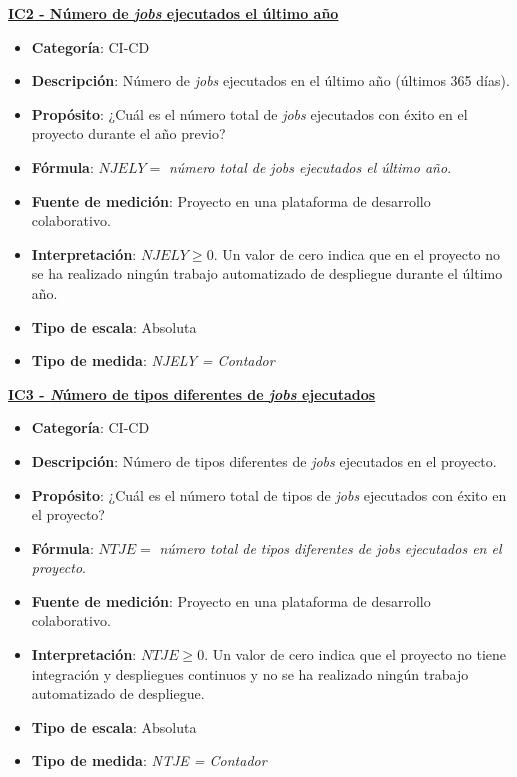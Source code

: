 \textbf{\underline{IC2 - Número de \textit{jobs} ejecutados el último año}}
\begin{itemize}
	\item \textbf{Categoría}: CI-CD
	\item \textbf{Descripción}: Número de \textit{jobs} ejecutados en el último año (últimos 365 días).
	\item \textbf{Propósito}: ¿Cuál es el número total de \textit{jobs} ejecutados con éxito en el proyecto durante el año previo?
	\item \textbf{Fórmula}: $NJELY =$ \textit{número total de jobs ejecutados el último año}.
	\item \textbf{Fuente de medición}: Proyecto en una plataforma de desarrollo colaborativo.
	\item \textbf{Interpretación}: $NJELY \geq 0$. Un valor de cero indica que en el proyecto no se ha realizado ningún trabajo automatizado de despliegue durante el último año.
	\item \textbf{Tipo de escala}: Absoluta
	\item \textbf{Tipo de medida}: \textit{NJELY = Contador}
\end{itemize}

\textbf{\underline{IC3 - \textit Número de tipos diferentes de \textit{jobs} ejecutados}}
\begin{itemize}
	\item \textbf{Categoría}: CI-CD
	\item \textbf{Descripción}: Número de tipos diferentes de \textit{jobs} ejecutados en el proyecto.
	\item \textbf{Propósito}: ¿Cuál es el número total de tipos de \textit{jobs} ejecutados con éxito en el proyecto?
	\item \textbf{Fórmula}: $NTJE =$ \textit{número total de tipos diferentes de jobs ejecutados en el proyecto}.
	\item \textbf{Fuente de medición}: Proyecto en una plataforma de desarrollo colaborativo.
	\item \textbf{Interpretación}: $NTJE \geq 0$. Un valor de cero indica que el proyecto no tiene integración y despliegues continuos y no se ha realizado ningún trabajo automatizado de despliegue.
	\item \textbf{Tipo de escala}: Absoluta
	\item \textbf{Tipo de medida}: \textit{NTJE = Contador}
\end{itemize}


